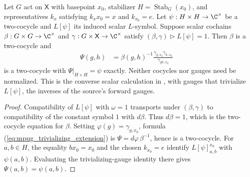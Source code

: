 \begin{lemma}
    \label{lem:mpug_trivializing_extension}
    \leanok
    Let $G$ act on $\mathsf X$ with basepoint $x_0$, stabilizer
    $H=\operatorname{Stab}_G(x_0)$, and representatives $k_x$ satisfying
    $k_xx_0=x$ and $k_{x_0}=e$. Let $\psi:H\times H\to\C^\times$ be a
    two-cocycle and $L[\psi]$ its induced scalar $L$-symbol.
    Suppose scalar cochains $\beta:G\times G\to\C^\times$ and
    $\gamma:G\times\mathsf X\to\C^\times$ satisfy
    $(\beta,\gamma)\mathbin{\triangleright}L[\psi]=1$.
    Then $\beta$ is a two-cocycle and
    \begin{align}
        \Psi(g,h)
         & =\beta(g,h)^{-1}
        \frac{\gamma_{g,x_0}\gamma_{h,x_0}}{\gamma_{gh,x_0}}
        \label{eq:mpug_trivializing_extension}
    \end{align}
    is a two-cocycle with $\Psi|_{H\times H}=\psi$ exactly.
    Neither cocycles nor gauges need be normalized.
    This is the converse scalar calculation in
    \cite[lines~7057--7064]{FrancoRubio2025MPUGauging}, with gauges that
    trivialize $L[\psi]$, the inverses of the source's forward gauges.
\end{lemma}

\begin{proof}\leanok
    Compatibility of $L[\psi]$ with $\omega=1$ transports under
    $(\beta,\gamma)$ to compatibility of the constant symbol $1$ with
    $d\beta$. Thus $d\beta=1$, which is the two-cocycle equation for
    $\beta$. Setting $\varphi(g)=\gamma_{g,x_0}$, formula
    (\ref{eq:mpug_trivializing_extension}) is
    $\Psi=d\varphi\,\beta^{-1}$, hence is a two-cocycle.
    For $a,b\in H$, the equality $bx_0=x_0$ and the chosen
    $k_{x_0}=e$ identify $L[\psi]^{x_0}_{a,b}$ with $\psi(a,b)$.
    Evaluating the trivializing-gauge identity there gives
    $\Psi(a,b)=\psi(a,b)$.
\end{proof}

